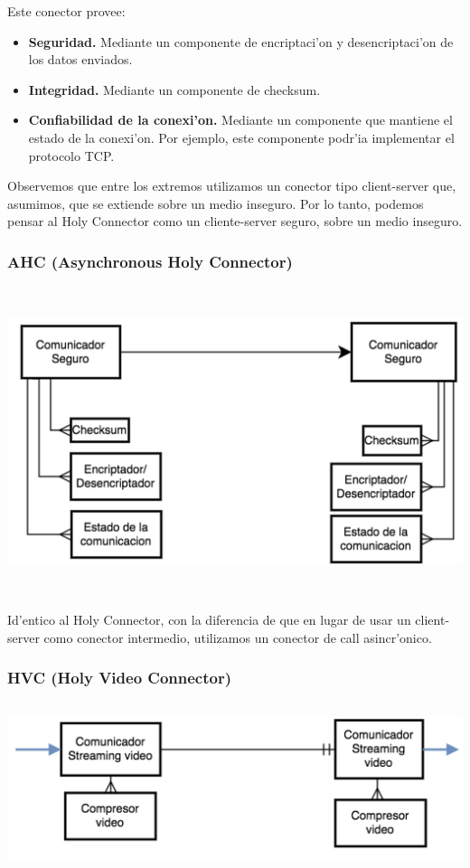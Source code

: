 Este conector provee:

\begin{itemize}
	\item \textbf{Seguridad.} Mediante un componente de encriptaci'on y desencriptaci'on de los datos enviados.
	\item \textbf{Integridad.} Mediante un componente de checksum.
	\item \textbf{Confiabilidad de la conexi'on.} Mediante un componente que mantiene el estado de la conexi'on. Por ejemplo, este componente podr'ia implementar el protocolo TCP.
\end{itemize}

Observemos que entre los extremos utilizamos un conector tipo client-server que, asumimos, que se extiende sobre un medio inseguro. Por lo tanto, podemos pensar al Holy Connector como un cliente-server seguro, sobre un medio inseguro.

\subsubsection{AHC (Asynchronous Holy Connector)}

\includegraphics[height=9cm]{diagramas/HCCA} 

Id'entico al Holy Connector, con la diferencia de que en lugar de usar un client-server como conector intermedio, utilizamos un conector de call asincr'onico.

\subsubsection{HVC (Holy Video Connector)}

\includegraphics[height=5cm]{diagramas/HVC} 


